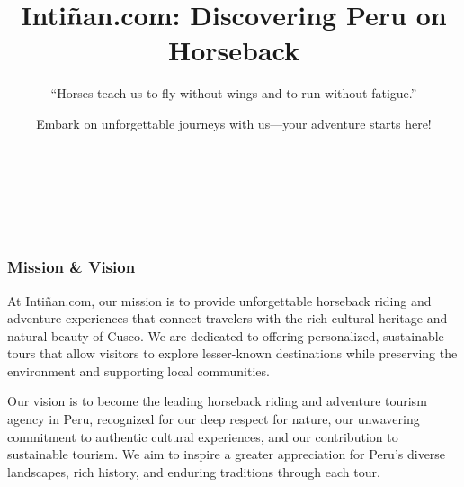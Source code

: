 \documentclass[12pt]{beamer}
\title{Intiñan.com: Discovering Peru on Horseback}
\subtitle{“Horses teach us to fly without wings and to run without fatigue.”}
\author{Embark on unforgettable journeys with us—your adventure starts here!}
\date{}
\begin{document}
	\begin{frame}
		\begin{center}
			{\large\textbf{\inserttitle}}\\
			\vspace*{2mm}
			{\itshape \insertsubtitle}\\
			\vspace*{2mm}
			{\inserttitlegraphic}\\
			\vspace*{2mm}
			{\textbf{\insertauthor}}
		\end{center}
	\end{frame}
	
	\begin{frame}
		\frametitle{Mission \& Vision}
%					
				\begin{tcolorbox}[frogbox,title=Mission, fonttitle=\bfseries]
					At Intiñan.com, our mission is to provide unforgettable horseback riding and adventure experiences that connect travelers with the rich cultural heritage and natural beauty of Cusco. We are dedicated to offering personalized, sustainable tours that allow visitors to explore lesser-known destinations while preserving the environment and supporting local communities.
				\end{tcolorbox}

	\end{frame}
	
	\begin{frame}
		\begin{tcolorbox}[frogbox,title=Vision, fonttitle=\bfseries]
			Our vision is to become the leading horseback riding and adventure tourism agency in Peru, recognized for our deep respect for nature, our unwavering commitment to authentic cultural experiences, and our contribution to sustainable tourism. We aim to inspire a greater appreciation for Peru’s diverse landscapes, rich history, and enduring traditions through each tour.
		\end{tcolorbox}
	\end{frame}
	
\end{document}
